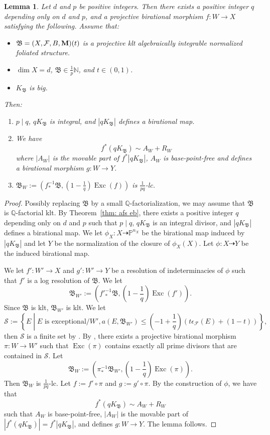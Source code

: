 \documentclass[11pt,reqno]{amsart}
\numberwithin{equation}{section}
\newcommand{\Mm}{{\bf{M}}}
\newcommand{\Exc}{\operatorname{Exc}}
\newcommand{\Bb}{{\mathfrak{B}}}
\newcommand{\Ff}{\mathcal{F}}
\newtheorem{lem}[thm]{Lemma}
\theoremstyle{definition}
\begin{document}
\begin{lem}\label{lem: special model for eb}
Let $d$ and $p$ be positive integers. Then there exists a positive integer $q$ depending only on $d$ and $p$, and a projective birational morphism $f: W\rightarrow X$ satisfying the following. Assume that:
\begin{itemize}
    \item $\Bb=(X,\Ff,B,\Mm)(t)$ is a projective klt algebraically integrable normalized foliated structure.
    \item $\dim X=d$, $\Bb\in\frac{1}{p}\mathbb N$, and $t\in (0,1)$.
    \item $K_{\Bb}$ is big.
\end{itemize}
Then:
\begin{enumerate}
\item $p\mid q$, $qK_{\Bb}$ is integral, and $|qK_{\Bb}|$ defines a birational map.
\item We have
        $$f^*(qK_{\Bb})\sim A_W+R_W$$
    where $|A_W|$ is the movable part of $f^*|qK_{\Bb}|$, $A_W$ is base-point-free and defines a birational morphism $g: W\rightarrow Y$.
\item $\Bb_W:=\left(f^{-1}_*\Bb,\left(1-\frac{1}{q}\right)\Exc(f)\right)$ is $\frac{1}{pq}$-lc.
\end{enumerate}
\end{lem}
\begin{proof}
Possibly replacing $\Bb$ by a small $\mathbb Q$-factorialization, we may assume that $\Bb$ is $\mathbb Q$-factorial klt. By Theorem~\ref{thm: afs eb}, there exists a positive integer $q$ depending only on $d$ and $p$ such that $p\mid q$, $qK_{\Bb}$ is an integral divisor, and $|qK_{\Bb}|$ defines a birational map. We let $\phi_X: X\dashrightarrow \mathbb P^{n_X}$ be the birational map induced by $|qK_{\Bb}|$ and let $Y$ be the normalization of the closure of $\phi_X(X)$. Let $\phi\colon X\dashrightarrow Y$ be the induced birational map. 

We let $f': W'\rightarrow X$ and $g': W'\rightarrow Y$ be a resolution of indeterminacies of $\phi$ such that $f'$ is a log resolution of $\Bb$. We let
$$\Bb_{W'}:=\left(f'^{-1}_*\Bb,\left(1-\frac{1}{q}\right)\Exc(f')\right).$$
Since $\Bb$ is klt, $\Bb_{W'}$ is klt. We let 
$$\mathcal{S}:=\left\{E\middle| E\text{ is exceptional}/W', a(E,\Bb_{W'})\leq \left(-1+\frac{1}{q}\right)(t\epsilon_{\Ff}(E)+(1-t))\right\},$$
then $\mathcal{S}$ is a finite set by \cite[Lemma~2.13]{CLW26}. By \cite[Theorem~2.2.3]{Cas+25a}, there exists a projective birational morphism $\pi: W\rightarrow W'$ such that $\Exc(\pi)$ contains exactly all prime divisors that are contained in $\mathcal{S}$. Let
$$\Bb_W:=\left(\pi^{-1}_*\Bb_{W'},\left(1-\frac{1}{q}\right)\Exc(\pi)\right).$$
Then $\Bb_W$ is $\frac{1}{pq}$-lc. Let $f:=f'\circ\pi$ and $g:=g'\circ\pi$. By the construction of $\phi$, we have that
$$f^*(qK_{\Bb})\sim A_W+R_W$$
such that $A_W$ is base-point-free, $|A_W|$ is the movable part of $|f^*(qK_{\Bb})|=f^*|qK_{\Bb}|$, and defines $g: W\rightarrow Y$. The lemma follows.
\end{proof}
\end{document}
